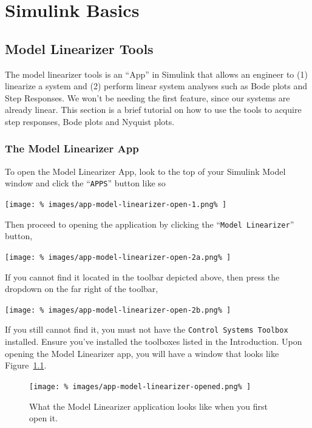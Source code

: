 \chapter{Simulink Basics}\label{App:Simulink}

\section{Model Linearizer Tools}\label{App:Simulink:ModelLinearizer}
The model linearizer tools is an ``App'' in Simulink that allows an engineer to
(1) linearize a system and (2) perform linear system analyses such as Bode
plots and Step Responses. We won't be needing the first feature, since our
systems are already linear. This section is a brief tutorial on how to use
the tools to acquire step responses, Bode plots and Nyquist plots.

\subsection{The Model Linearizer App}
To open the Model Linearizer App, look to the top of your Simulink Model
window and click the ``\texttt{APPS}'' button like so
%
\begin{center}
  \texttt{[image: \%
    images/app-model-linearizer-open-1.png\%
  ]}
\end{center}
%
Then proceed to opening the application by clicking the ``\texttt{Model
Linearizer}'' button,
%
\begin{center}
  \texttt{[image: \%
    images/app-model-linearizer-open-2a.png\%
  ]}
\end{center}
%
If you cannot find it located in the toolbar depicted above, then press the
dropdown on the far right of the toolbar,
%
\begin{center}
  \texttt{[image: \%
    images/app-model-linearizer-open-2b.png\%
  ]}
\end{center}
%
If you still cannot find it, you must not have the \texttt{Control Systems
Toolbox} installed. Ensure you've installed the toolboxes listed in the
Introduction. Upon opening the Model Linearizer app, you
will have a window that looks like Figure~\ref{fig:app1:model-linearizer}.
%
\begin{figure}[H]
  \centering
  \texttt{[image: \%
    images/app-model-linearizer-opened.png\%
  ]}
  \caption[The Model Linearizer App]{%
    What the Model Linearizer application looks like when you first open it.%
  }
  \label{fig:app1:model-linearizer}
\end{figure}

